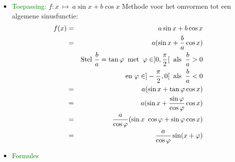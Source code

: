 \begin{itemize}
\begin{itemize}
		\end{itemize}
\item \textcolor{green}{Toepassing: } $f:x\:\mapsto\:a\sin x+b \cos x$
\newline\newline
Methode voor het omvormen tot een algemene sinusfunctie:
\begin{eqnarray*}
f(x) & = & a\sin{x} + b\cos{x}\\
     & = & a(\sin{x} + \frac{b}{a}\cos{x})\\
     &   & \text{Stel } \displaystyle\frac{\displaystyle b}{\displaystyle a} = \tan{\varphi}\:\text{ met } \:\varphi \in ]0, \displaystyle\frac{\displaystyle \pi}{\displaystyle 2}[ \:\text{ als }\: \displaystyle\frac{\displaystyle b}{\displaystyle a} > 0 \\
     &   & \text{en } \varphi \in ]-\displaystyle\frac{\displaystyle \pi}{\displaystyle 2}, 0[ \:\text{ als }\: \displaystyle\frac{\displaystyle b}{\displaystyle a} < 0 \\
     & = & a(\sin{x} + \tan{\varphi}\cos{x})\\
     & = & a(\sin{x} + \frac{\sin{\varphi}}{\cos{\varphi}}\cos{x})\\
     & = & \displaystyle \frac{\displaystyle a}{\displaystyle \cos\varphi}(\sin x\ \cos \varphi + \sin \varphi \cos{x})\\			
     & = & \displaystyle \frac{\displaystyle a}{\displaystyle \cos\varphi}\sin(x + \varphi)
\end{eqnarray*}
	\item \textcolor{green}{Formules}\newline 
\end{itemize}

\hypertarget{exponentiele_functies}{}

